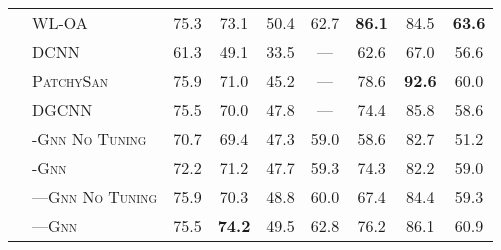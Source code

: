 \documentclass[letterpaper]{article}
\theoremstyle{definition}
\begin{document}
\begin{table*}[t]
\begin{tabular}{@{}clccccccc@{}}
		& \textsc{WL-OA}                     & 75.3           & 73.1                & 50.4                  & 62.7                & \textbf{86.1}     & 84.5               & \textbf{63.6}       
		\\
		\cmidrule{2-9}
		\multirow{7}{*}{\rotatebox{90}{GNN}}
		& \textsc{DCNN}                      & 61.3           & 49.1                & 33.5                  & ---                 & 62.6              & 67.0               & 56.6                \\
		& \textsc{PatchySan}                 & 75.9           & 71.0                & 45.2                  & ---                 & 78.6              & \textbf{92.6}      & 60.0                \\
		& \textsc{DGCNN}                     & 75.5           & 70.0                & 47.8                  & ---                 & 74.4              & 85.8               & 58.6                \\     
		\cmidrule{2-9}   
		
		& \textsc{-Gnn No Tuning}         & 70.7           & 69.4                & 47.3                  & 59.0                & 58.6              & 82.7               & 51.2                \\
		& \textsc{-Gnn}                   & 72.2           & 71.2                & 47.7                  & 59.3                & 74.3              & 82.2               & 59.0                \\
		& \textsc{---Gnn No Tuning} & 75.9           & 70.3                & 48.8                  & 60.0                & 67.4              & 84.4               & 59.3                \\
		& \textsc{---Gnn}           & 75.5           & \textbf{74.2}       & 49.5                  & 62.8                & 76.2              & 86.1               & 60.9                \\
\bottomrule
	\end{tabular}
\end{table*}
\end{document}
